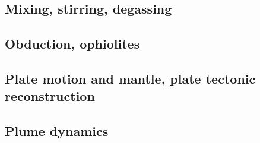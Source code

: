 \subsection*{Mixing, stirring, degassing} 

\cite{olyb84}
\cite{ketu90}
\cite{pelt96}
\cite{cori99}
\cite{huke01}
\cite{vahb02}
\cite{fasa03}
\cite{colt05}
\cite{gogc07}\cite{nake07}
\cite{lemj11}\cite{saad11}
\cite{onzh18}

\subsection*{Obduction, ophiolites}
 

\noindent
\cite{hack90}
\cite{hack91}
\cite{mokd00}
\cite{agzf14}
\cite{duay16}


\subsection*{Plate motion and mantle, plate tectonic reconstruction}

\noindent
\cite{mcse73}
\cite{zieg92a}
\cite{guto94}
\cite{zhgm98}
\cite{evan03}\cite{reta03}
\cite{lizh09}\cite{vasv09}
\cite{huss12}\cite{gutz12}\cite{qumm12}\cite{holr12}
\cite{mosq13}\cite{cost13}
\cite{yoha15}
\cite{tewg19}

\subsection*{Plume dynamics}

